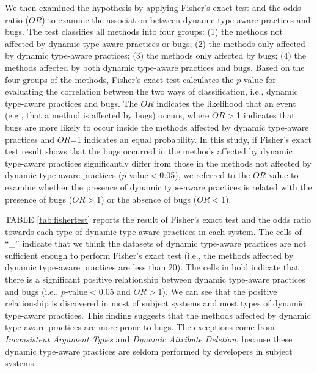 We then examined the hypothesis by applying Fisher's exact test and the odds ratio ($OR$)\cite{b32} to examine the association between dynamic type-aware practices and bugs. The test classifies all methods into four groups: (1) the methods not affected by dynamic type-aware practices or bugs;  (2) the methods only affected by dynamic type-aware practices; (3) the methods only affected by bugs; (4) the methods affected by both dynamic type-aware practices and bugs. Based on the four groups of the methods, Fisher's exact test calculates the $p$-value for evaluating the correlation between the two ways of classification, i.e., dynamic type-aware practices and bugs. The $OR$ indicates the likelihood that an event (e.g., that a method is affected by bugs) occurs, where $OR$$>$1 indicates that bugs are more likely to occur inside the methods affected by dynamic type-aware practices and $OR$=1 indicates an equal probability. In this study, if Fisher's exact test result shows that the bugs occurred in the methods affected by dynamic type-aware practices significantly differ from those in the methods not affected by dynamic type-aware practices ($p$-value$<$0.05), we referred to the $OR$ value to examine whether the presence of dynamic type-aware practices is related with the presence of bugs ($OR$$>$1) or the absence of bugs ($OR$$<$1). 

TABLE \ref{tab:fishertest} reports the result of Fisher's exact test and the odds ratio towards each type of dynamic type-aware practices in each system. The cells of ``\_'' indicate that we think the datasets of dynamic type-aware practices are not sufficient enough to perform Fisher's exact test (i.e., the methods affected by dynamic type-aware practices are less than 20). The cells in bold indicate that there is a significant positive relationship between dynamic type-aware practices and bugs (i.e., $p$-value$<$0.05 and $OR$$>$1). We can see that the positive relationship is discovered in most of subject systems and most types of dynamic type-aware practices. This finding suggests that the methods affected by dynamic type-aware practices are more prone to bugs. The exceptions come from \emph{Inconsistent Argument Types} and \emph{Dynamic Attribute Deletion}, because these dynamic type-aware practices are seldom performed by developers in subject systems.

